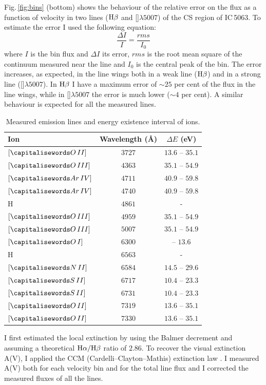\documentclass[../thesis.tex]{subfiles}
\begin{document}
Fig.\,\ref{fig:bins} (bottom) shows the behaviour of the relative error on the flux as a function of velocity in two lines ($\rm H\beta$ and []$\lambda5007$) of the CS region of IC\,5063.
To estimate the error I used the following equation:
\begin{equation}
\frac{\Delta I}{I}=\frac{rms}{I_0}
\end{equation}
where $I$ is the bin flux and $\Delta I$ its error, $rms$ is the root mean square of the continuum measured near the line and $I_0$ is the central peak of the bin.
The error increases, as expected, in the line wings both in a weak line ($\rm H\beta$) and in a strong line ([]$\lambda5007$).
In $\rm H\beta$ I have a maximum error of $\sim25$ per cent of the flux in the line wings, while in []$\lambda5007$ the error is much lower ($\sim4$ per cent).
A similar behaviour is expected for all the measured lines.


\begin{table}
\caption[]{Measured emission lines and energy existence interval of ions.}
\label{tab:ion}
\centering
\begin{tabular}{lcc}
\hline
Ion&Wavelength (\AA)&$\Delta E$ (eV)\\
\hline
$[\ion{O}{II}]$& $3727$&$13.6$ -- $35.1$\\
$[\ion{O}{III}]$& $4363$&$35.1$ -- $54.9$\\
$[\ion{Ar}{IV}]$& $4711$&$40.9$ -- $59.8$\\
$[\ion{Ar}{IV}]$&$4740$&$40.9$ -- $59.8$\\
H& $4861$&-\\
$[\ion{O}{III}]$& $4959$&$35.1$ -- $54.9$\\
$[\ion{O}{III}]$& $5007$&$35.1$ -- $54.9$\\
$[\ion{O}{I}]$& $6300$&-- $13.6$\\
H&$6563$&-\\
$[\ion{N}{II}]$& $6584$&$14.5$ -- $29.6$\\
$[\ion{S}{II}]$& $6717$&$10.4$ -- $23.3$\\
$[\ion{S}{II}]$&$6731$&$10.4$ -- $23.3$\\
$[\ion{O}{II}]$& $7319$&$13.6$ -- $35.1$\\
$[\ion{O}{II}]$&  $7330$&$13.6$ -- $35.1$\\
\hline
\end{tabular}
\end{table}

I first estimated the local extinction by using the Balmer decrement and assuming a theoretical $\rm H\alpha/\rm H\beta$ ratio of $2.86$.
To recover the visual extinction A(V), I applied the CCM (Cardelli--Clayton--Mathis) extinction law \citep{Cardelli89}.
I measured A(V) both for each velocity bin and for the total line flux and I corrected the measured fluxes of all the lines.
\end{document}
